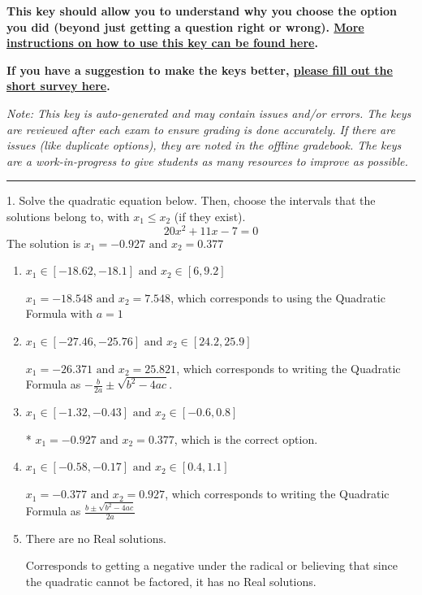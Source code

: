 \documentclass{extbook}[14pt]
\begin{document}
\textbf{This key should allow you to understand why you choose the option you did (beyond just getting a question right or wrong). \href{https://xronos.clas.ufl.edu/mac1105spring2020/courseDescriptionAndMisc/Exams/LearningFromResults}{More instructions on how to use this key can be found here}.}

\textbf{If you have a suggestion to make the keys better, \href{https://forms.gle/CZkbZmPbC9XALEE88}{please fill out the short survey here}.}

\textit{Note: This key is auto-generated and may contain issues and/or errors. The keys are reviewed after each exam to ensure grading is done accurately. If there are issues (like duplicate options), they are noted in the offline gradebook. The keys are a work-in-progress to give students as many resources to improve as possible.}

\rule{\textwidth}{0.4pt}

1. Solve the quadratic equation below. Then, choose the intervals that the solutions belong to, with $x_1 \leq x_2$ (if they exist).
\[ 20x^{2} +11 x -7 = 0 \] 
The solution is $ x_1 = -0.927 \text{ and } x_2 = 0.377 $ 

\begin{enumerate}[label=\Alph*.] 
\item $ x_1 \in [-18.62, -18.1] \text{ and } x_2 \in [6, 9.2] $ 

  $x_1 = -18.548 \text{ and } x_2 = 7.548$, which corresponds to using the Quadratic Formula with $a=1$ 
\item $ x_1 \in [-27.46, -25.76] \text{ and } x_2 \in [24.2, 25.9] $ 

  $x_1 = -26.371 \text{ and } x_2 = 25.821$, which corresponds to writing the Quadratic Formula as $-\frac{b}{2a} \pm \sqrt{b^2 - 4ac}$. 
\item $ x_1 \in [-1.32, -0.43] \text{ and } x_2 \in [-0.6, 0.8] $ 

 * $x_1 = -0.927 \text{ and } x_2 = 0.377$, which is the correct option. 
\item $ x_1 \in [-0.58, -0.17] \text{ and } x_2 \in [0.4, 1.1] $ 

  $x_1 = -0.377 \text{ and } x_2 = 0.927$, which corresponds to writing the Quadratic Formula as $\frac{b \pm \sqrt{b^2 - 4ac}}{2a}$ 
\item $ \text{There are no Real solutions.} $ 

 Corresponds to getting a negative under the radical or believing that since the quadratic cannot be factored, it has no Real solutions. 
\end{enumerate} 
 
\end{document}
